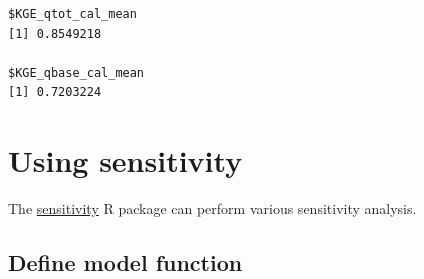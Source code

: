 \documentclass[
]{book}
\begin{document}
\begin{verbatim}
$KGE_qtot_cal_mean
[1] 0.8549218

$KGE_qbase_cal_mean
[1] 0.7203224
\end{verbatim}

\hypertarget{using-sensitivity}{%
\section{Using sensitivity}\label{using-sensitivity}}

The \href{https://cran.r-project.org/package=sensitivity}{sensitivity} R package can perform various sensitivity analysis.

\hypertarget{define-model-function}{%
\subsection{Define model function}\label{define-model-function}}
\end{document}
